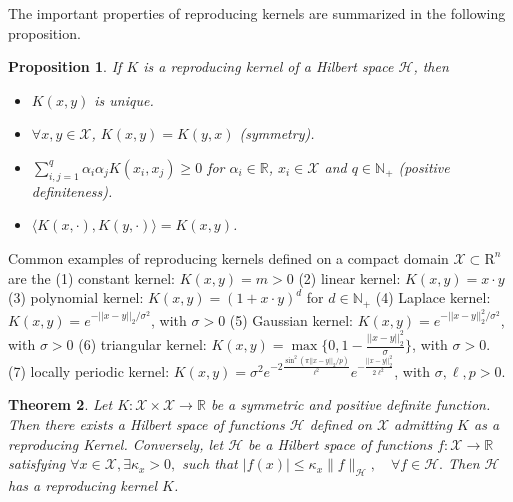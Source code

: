 \documentclass[11pt]{article}
\theoremstyle{plain}
\newtheorem{theorem}{Theorem}[section]
\newtheorem{proposition}[theorem]{Proposition}
\newcommand{\RR}{\mathbb{R}}
\newcommand{\NN}{\mathbb{N}}
\begin{document}
The important properties of reproducing kernels are summarized in the following proposition.
\begin{proposition}\label{prop1} \cite{aronszajn50reproducing}
If $K$ is a reproducing kernel of a Hilbert space ${\mathcal H}$, then
\begin{itemize}
\item[i.] $K(x,y)$ is unique.
\item[ii.]  $\forall x,y \in {\mathcal X}$, $K(x,y)=K(y,x)$ (symmetry).
\item[iii.] $\sum_{i,j=1}^q\alpha_i\alpha_j K(x_i,x_j) \ge 0$ for $\alpha_i \in \RR$, $x_i \in {\mathcal X}$ and $q\in\mathbb{N}_+$
(positive definiteness).
\item[iv.] $\langle K(x,\cdot),K(y,\cdot) \rangle=K(x,y)$.
\end{itemize}
\end{proposition}
Common examples of reproducing kernels defined on a compact domain $\mathcal{X} \subset \mathrm{R}^n$ are the 
(1) constant kernel: $K(x,y)= m > 0$
(2) linear kernel: $K(x,y)=x\cdot y$
(3) polynomial kernel: $K(x,y)=(1+x\cdot y)^d$ for $d \in \NN_+$
(4) Laplace kernel: $K(x,y)=e^{-||x-y||_2/\sigma^2}$, with $\sigma >0$
(5)  Gaussian kernel: $K(x,y)=e^{-||x-y||^2_2/\sigma^2}$, with $\sigma >0$
(6) triangular kernel: $K(x,y)=\max \{0,1-\frac{||x-y||_2^2}{\sigma} \}$, with $\sigma >0$.
(7) locally periodic kernel: $K(x,y)=\sigma^2 e^{-2 \frac{ \sin^2(\pi ||x-y||_2/p)}{\ell^2}}e^{-\frac{||x-y||_2^2}{2 \ell^2}}$, with $\sigma, \ell, p >0$.
  




\begin{theorem} \label{thm1} \cite{aronszajn50reproducing}
Let $K:{\mathcal X} \times {\mathcal X} \rightarrow \RR$ be a symmetric and positive definite function. Then there
exists a Hilbert space of functions ${\mathcal H}$ defined on ${\mathcal X}$   admitting $K$ as a reproducing Kernel.
Conversely, let  ${\mathcal H}$ be a Hilbert space of functions $f: {\mathcal X} \rightarrow \RR$ satisfying
$\forall x \in {\mathcal X}, \exists \kappa_x>0,$ such that $|f(x)| \le \kappa_x \|f\|_{\mathcal H},
\quad \forall f \in {\mathcal H}. $
Then ${\mathcal H}$ has a reproducing kernel $K$.
\end{theorem}

\end{document}
